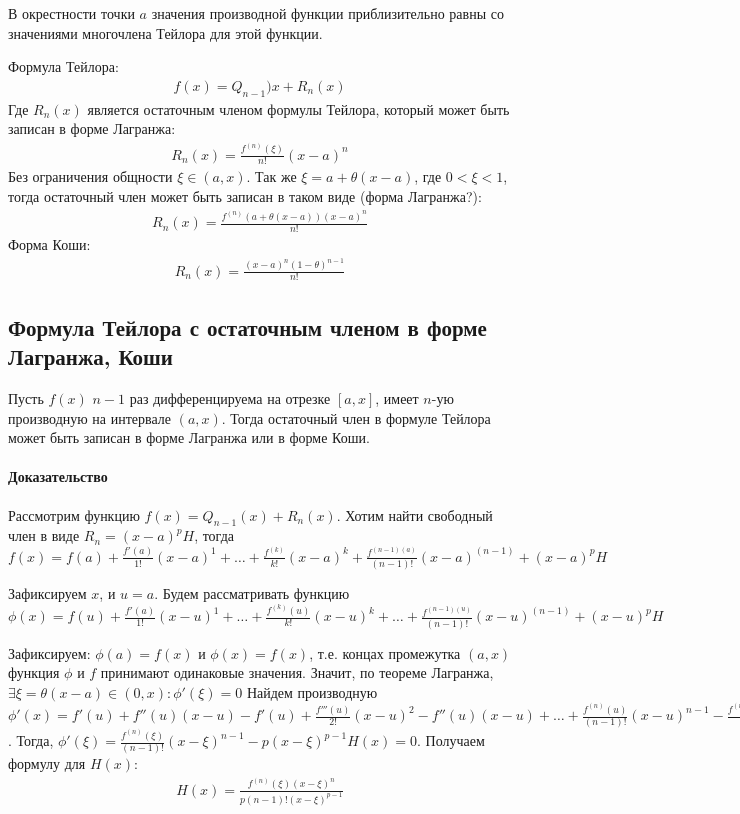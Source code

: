 \documentclass[10pt]{article}
\begin{document}
			В окрестности точки $a$ значения производной функции приблизительно равны со значениями многочлена Тейлора для этой функции.
			
			Формула Тейлора:	
			\begin{eqnarray}
				f(x) = Q_{n-1})x + R_n(x)
			\end{eqnarray}
			Где $R_n(x)$ является остаточным членом формулы Тейлора, который может быть записан в форме Лагранжа:
			\begin{eqnarray}
				R_n(x) = \frac{f^{(n)}(\xi)}{n!}(x-a)^n
			\end{eqnarray}
			Без ограничения общности $\xi \in (a, x)$. Так же $\xi = a + \theta(x-a)$, где $0 < \xi < 1$, тогда остаточный член может быть записан в таком виде (форма Лагранжа?):
			\begin{eqnarray}
				R_n(x) = \frac{f^{(n)}(a + \theta(x-a))(x-a)^n}{n!}
			\end{eqnarray}
			Форма Коши:
			\begin{eqnarray}
				R_n(x) = \frac{(x-a)^n(1-\theta)^{n-1}}{n!}
			\end{eqnarray}
				
			\subsection{Формула Тейлора с остаточным членом в форме Лагранжа, Коши}
			Пусть $f(x)$ $n-1$ раз дифференцируема на отрезке $[a, x]$, имеет $n$-ую производную на интервале $(a, x)$. Тогда остаточный член в формуле Тейлора может быть записан в форме Лагранжа или в форме Коши.
			
			\paragraph{Доказательство}
			Рассмотрим функцию $f(x) = Q_{n-1}(x) + R_n(x)$. Хотим найти свободный член в виде $R_n = (x-a)^pH$,
			тогда $f(x) = f(a) + \frac{f'(a)}{1!}(x-a)^1 + \dots + \frac{f^{(k)}}{k!}(x-a)^k + \frac{f^{(n-1)(a)}}{(n-1)!}(x-a)^(n-1) + (x-a)^pH$
			
			Зафиксируем $x$, и $u = a$. Будем рассматривать функцию $\phi(x) =  f(u) + \frac{f'(a)}{1!}(x-u)^1 + \dots + \frac{f^{(k)}(u)}{k!}(x-u)^k + \dots + \frac{f^{(n-1)(u)}}{(n-1)!}(x-u)^(n-1) + (x-u)^pH$
			
			Зафиксируем: $\phi(a) = f(x)$ и $\phi(x) = f(x)$, т.е. концах промежутка $(a, x)$ функция $\phi$ и $f$ принимают одинаковые значения. Значит, по теореме Лагранжа, $\exists \xi = \theta(x-a) \in (0, x) : \phi'(\xi) = 0$ Найдем производную $\phi'(x) = f'(u) + f''(u)(x-u) - f'(u) + \frac{f'''(u)}{2!}(x-u)^2 - f''(u)(x-u) + \dots + \frac{f^{(n)}(u)}{(n-1)!}(x-u)^{n-1} - \frac{f^{(n-1)}(u)}{n-2}(x-u)^{n-2} - p(x-u)^{p-1}H(x) = $. Тогда, $\phi'(\xi) = \frac{f^{(n)}(\xi)}{(n-1)!}(x - \xi)^{n-1} - p(x-\xi)^{p-1}H(x) = 0$.
			Получаем формулу для $H(x)$:
			\begin{eqnarray}
				\nonumber H(x) = \frac{f^{(n)}(\xi)(x-\xi)^n}{p(n-1)!(x-\xi)^{p-1}}
			\end{eqnarray}
			
\end{document}
